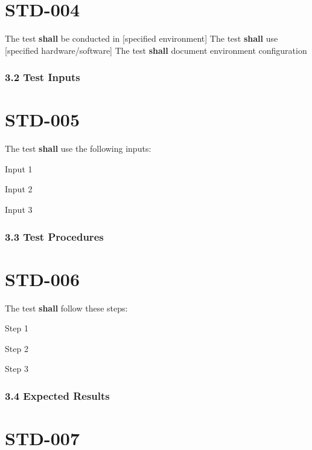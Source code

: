 \section{STD-004}\label{STD-004}

The test \textbf{shall} be conducted in [specified environment]
The test \textbf{shall} use [specified hardware/software]
The test \textbf{shall} document environment configuration

\subsubsection{3.2 Test Inputs}

\section{STD-005}\label{STD-005}

The test \textbf{shall} use the following inputs:
\begin{itemizeDeep}
\item [Input 1]
\item [Input 2]
\item [Input 3]
\end{itemizeDeep}

\subsubsection{3.3 Test Procedures}

\section{STD-006}\label{STD-006}

The test \textbf{shall} follow these steps:
\begin{enumerateDeep}
\item [Step 1]
\item [Step 2]
\item [Step 3]
\end{enumerateDeep}

\subsubsection{3.4 Expected Results}

\section{STD-007}\label{STD-007}

